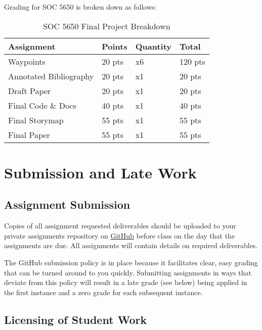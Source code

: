 \documentclass[
]{book}
\begin{document}
Grading for SOC 5650 is broken down as follows:

\begin{table}

\caption{\label{tab:unnamed-chunk-6}SOC 5650 Final Project Breakdown}
\centering
\begin{tabular}[t]{llll}
\toprule
Assignment & Points & Quantity & Total\\
\midrule
Waypoints & 20 pts & x6 & 120 pts\\
Annotated Bibliography & 20 pts & x1 & 20 pts\\
Draft Paper & 20 pts & x1 & 20 pts\\
Final Code \& Docs & 40 pts & x1 & 40 pts\\
Final Storymap & 55 pts & x1 & 55 pts\\
\addlinespace
Final Paper & 55 pts & x1 & 55 pts\\
\bottomrule
\end{tabular}
\end{table}

\hypertarget{submission-and-late-work}{%
\section{Submission and Late Work}\label{submission-and-late-work}}

\hypertarget{assignment-submission}{%
\subsection{Assignment Submission}\label{assignment-submission}}

Copies of all assignment requested deliverables should be uploaded to your private assignments repository on \href{https://github.com/slu-soc5650}{GitHub} before class on the day that the assignments are due. All assignments will contain details on required deliverables.

The GitHub submission policy is in place because it facilitates clear, easy grading that can be turned around to you quickly. Submitting assignments in ways that deviate from this policy will result in a late grade (see below) being applied in the first instance and a zero grade for each subsequent instance.

\hypertarget{licensing-of-student-work}{%
\subsection{Licensing of Student Work}\label{licensing-of-student-work}}
\end{document}
